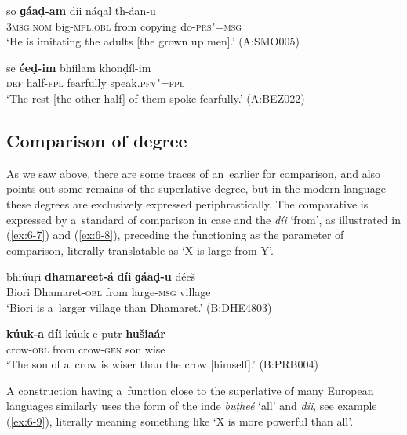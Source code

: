 \begin{exe}
\ex
\label{ex:6-5}
\gll so \textbf{ɡáaḍ-am} díi náqal th-áan-u \\
\textsc{3msg.nom} big-\textsc{mpl.obl} from copying do-\textsc{prs"=msg} \\
\glt `He is imitating the adults [the grown up men].' (A:SMO005)

\ex
\label{ex:6-6}
\gll se \textbf{éeḍ-im} bhíilam khonḍíl-im \\
\textsc{def} half-\textsc{fpl} fearfully speak.\textsc{pfv"=fpl} \\
\glt `The rest [the other half] of them spoke fearfully.' (A:BEZ022)
\end{exe}

\subsection{Comparison of degree}
\label{subsec:6-3-3}

As we saw above, there are some traces of an~earlier  for comparison, and \citet[17]{morgenstierne1941} also points out some remains of the \iliOIA superlative degree, but in the modern language these degrees are exclusively expressed periphrastically. The comparative is expressed by a~standard of comparison in  case and the  \textit{díi} `from', as illustrated in (\ref{ex:6-7}) and (\ref{ex:6-8}), preceding the  functioning as the parameter of comparison, literally translatable as `X is large from Y'. 

\begin{exe}
\ex
\label{ex:6-7}
\gll bhiúuṛi \textbf{dhamareet-á} \textbf{díi} \textbf{ɡáaḍ-u} déeš \\
Biori Dhamaret-\textsc{obl} from large-\textsc{msg} village \\
\glt `Biori is a~larger village than Dhamaret.' (B:DHE4803)

\ex
\label{ex:6-8}
\gll \textbf{kúuk-a} \textbf{díi} kúuk-e putr \textbf{hušiaár} \\
crow-\textsc{obl} from crow-\textsc{gen} son wise  \\
\glt `The son of a~crow is wiser than the crow [himself].' (B:PRB004)
\end{exe}

A construction having a~function close to the superlative of many European languages similarly uses the  form of the inde  \textit{buṭheé} `all' and \textit{díi}, see example (\ref{ex:6-9}), literally meaning something like `X is more powerful than all'.

